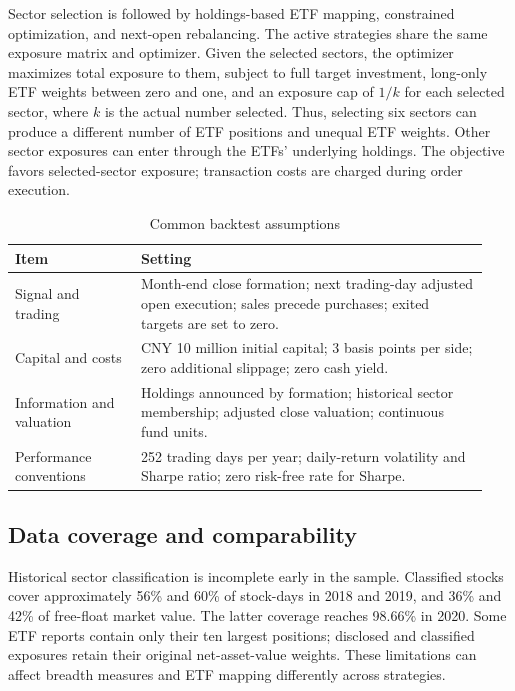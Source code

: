 Sector selection is followed by holdings-based ETF mapping, constrained optimization, and next-open rebalancing. The active strategies share the same exposure matrix and optimizer. Given the selected sectors, the optimizer maximizes total exposure to them, subject to full target investment, long-only ETF weights between zero and one, and an exposure cap of $1/k$ for each selected sector, where $k$ is the actual number selected. Thus, selecting six sectors can produce a different number of ETF positions and unequal ETF weights. Other sector exposures can enter through the ETFs' underlying holdings. The objective favors selected-sector exposure; transaction costs are charged during order execution.

\begin{table}[h]
\centering\small
\caption{Common backtest assumptions}
\begin{tabular}{@{}p{0.25\linewidth}p{0.69\linewidth}@{}}\toprule
Item & Setting \\\midrule
Signal and trading & Month-end close formation; next trading-day adjusted open execution; sales precede purchases; exited targets are set to zero.\\
Capital and costs & CNY 10 million initial capital; 3 basis points per side; zero additional slippage; zero cash yield.\\
Information and valuation & Holdings announced by formation; historical sector membership; adjusted close valuation; continuous fund units.\\
Performance conventions & 252 trading days per year; daily-return volatility and Sharpe ratio; zero risk-free rate for Sharpe.\\\bottomrule
\end{tabular}
\end{table}

\subsection{Data coverage and comparability}
Historical sector classification is incomplete early in the sample. Classified stocks cover approximately 56\% and 60\% of stock-days in 2018 and 2019, and 36\% and 42\% of free-float market value. The latter coverage reaches 98.66\% in 2020. Some ETF reports contain only their ten largest positions; disclosed and classified exposures retain their original net-asset-value weights. These limitations can affect breadth measures and ETF mapping differently across strategies.

